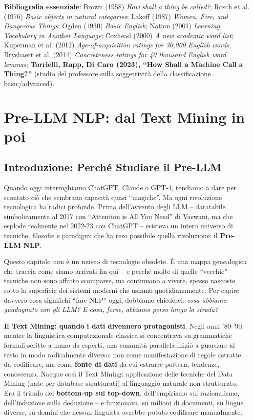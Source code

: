 \documentclass[12pt,a4paper]{article}
\begin{document}
\textbf{Bibliografia essenziale}: Brown (1958) \emph{How shall a thing be called?}; Rosch et al. (1976) \emph{Basic objects in natural categories}; Lakoff (1987) \emph{Women, Fire, and Dangerous Things}; Ogden (1930) \emph{Basic English}; Nation (2001) \emph{Learning Vocabulary in Another Language}; Coxhead (2000) \emph{A new academic word list}; Kuperman et al. (2012) \emph{Age-of-acquisition ratings for 30,000 English words}; Brysbaert et al. (2014) \emph{Concreteness ratings for 40 thousand English word lemmas}; \textbf{Torrielli, Rapp, Di Caro (2023), ``How Shall a Machine Call a Thing?''} (studio del professore sulla soggettivit\`a della classificazione basic/advanced).

\section{Pre-LLM NLP: dal Text Mining in poi}

\subsection{Introduzione: Perch\'e Studiare il Pre-LLM}

Quando oggi interroghiamo ChatGPT, Claude o GPT-4, tendiamo a dare per scontato ci\`o che sembrano capacit\`a quasi ``magiche''. Ma ogni rivoluzione tecnologica ha radici profonde. Prima dell'avvento degli LLM -- datatabile simbolicamente al 2017 con ``Attention is All You Need'' di Vaswani, ma che esplode realmente nel 2022-23 con ChatGPT -- esisteva un intero universo di tecniche, filosofie e paradigmi che ha reso possibile quella rivoluzione: il \textbf{Pre-LLM NLP}.

\begin{quizbox}
Questo capitolo non \`e un museo di tecnologie obsolete. \`E una mappa genealogica che traccia come siamo arrivati fin qui -- e perch\'e molte di quelle ``vecchie'' tecniche non sono affatto scomparse, ma continuano a vivere, spesso nascoste sotto la superficie dei sistemi moderni che usiamo quotidianamente. Per capire davvero cosa significhi ``fare NLP'' oggi, dobbiamo chiederci: \emph{cosa abbiamo guadagnato con gli LLM? E cosa, forse, abbiamo perso lungo la strada?}
\end{quizbox}

\textbf{Il Text Mining: quando i dati divennero protagonisti}. Negli anni '80-'90, mentre la linguistica computazionale classica si concentrava su grammatiche formali scritte a mano da esperti, una comunit\`a parallela inizi\`o a guardare al testo in modo radicalmente diverso: non come manifestazione di regole astratte da codificare, ma come \textbf{fonte di dati} da cui estrarre pattern, tendenze, conoscenza. Nacque cos\`i il Text Mining: applicazione delle tecniche del Data Mining (nate per database strutturati) al linguaggio naturale non strutturato. Era il trionfo del \textbf{bottom-up sul top-down}, dell'empirismo sul razionalismo, dell'induzione sulla deduzione -- e funzionava, su milioni di documenti, su lingue diverse, su domini che nessun linguista avrebbe potuto codificare manualmente.
\end{document}
